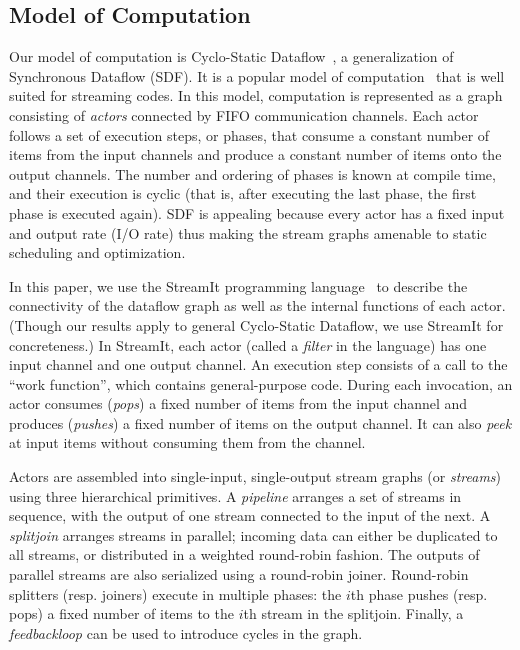 
\subsection{Model of Computation}
\label{sec:sdf}

Our model of computation is Cyclo-Static Dataflow~\cite{BELP96}, a
generalization of Synchronous Dataflow (SDF). It is a popular model of
computation~\cite{LM87-i} that is well suited for streaming codes. In
this model, computation is represented as a graph consisting of {\it
actors} connected by FIFO communication channels.  Each actor follows
a set of execution steps, or phases, that consume a constant number of
items from the input channels and produce a constant number of items
onto the output channels.  The number and ordering of phases is known
at compile time, and their execution is cyclic (that is, after
executing the last phase, the first phase is executed again).  SDF is
appealing because every actor has a fixed input and output rate (I/O
rate) thus making the stream graphs amenable to static scheduling and
optimization.

In this paper, we use the StreamIt programming
language~\cite{streamitcc} to describe the connectivity of the
dataflow graph as well as the internal functions of each actor.
(Though our results apply to general Cyclo-Static Dataflow, we use
StreamIt for concreteness.)  In StreamIt, each actor (called a {\it
filter} in the language) has one input channel and one output channel.
An execution step consists of a call to the ``work function'', which
contains general-purpose code.  During each invocation, an actor
consumes ({\it pops}) a fixed number of items from the input channel
and produces ({\it pushes}) a fixed number of items on the output
channel.  It can also {\it peek} at input items without consuming them
from the channel.

Actors are assembled into single-input, single-output stream graphs
(or {\it streams}) using three hierarchical primitives.  A {\it
pipeline} arranges a set of streams in sequence, with the output of
one stream connected to the input of the next.  A {\it splitjoin}
arranges streams in parallel; incoming data can either be duplicated
to all streams, or distributed in a weighted round-robin fashion.  The
outputs of parallel streams are also serialized using a round-robin
joiner.  Round-robin splitters (resp. joiners) execute in multiple
phases: the $i$th phase pushes (resp. pops) a fixed number of items to
the $i$th stream in the splitjoin.  Finally, a {\it feedbackloop} can
be used to introduce cycles in the graph.


